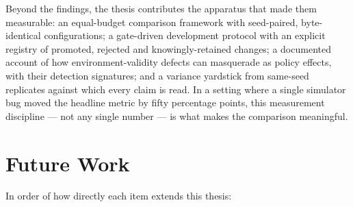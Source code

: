 Beyond the findings, the thesis contributes the apparatus that made them
measurable: an equal-budget comparison framework with seed-paired,
byte-identical configurations; a gate-driven development protocol with an
explicit registry of promoted, rejected and knowingly-retained changes;
a documented account of how environment-validity defects can masquerade
as policy effects, with their detection signatures; and a variance
yardstick from same-seed replicates against which every claim is read.
In a setting where a single simulator bug moved the headline metric by
fifty percentage points, this measurement discipline --- not any single
number --- is what makes the comparison meaningful.

\section{Future Work}
\label{sec:future}

In order of how directly each item extends this thesis:

